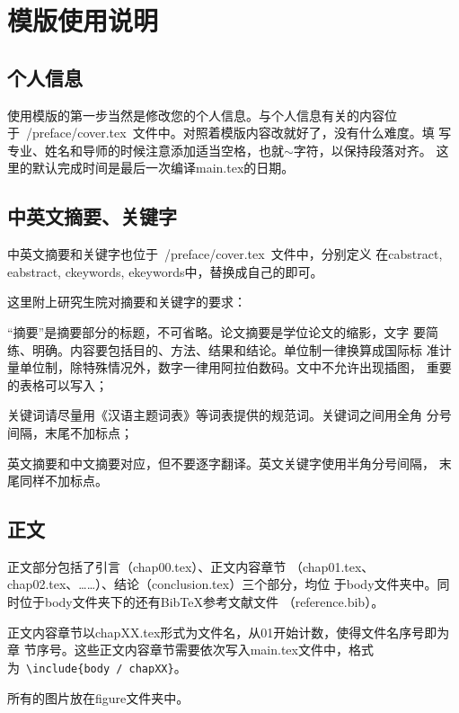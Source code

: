 ﻿%

\chapter{模版使用说明}
\label{chap01}

\section{个人信息}
使用模版的第一步当然是修改您的个人信息。与个人信息有关的内容位
于~{/preface/cover.tex}~文件中。对照着模版内容改就好了，没有什么难度。填
写专业、姓名和导师的时候注意添加适当空格，也就$\sim$字符，以保持段落对齐。
这里的默认完成时间是最后一次编译main.tex的日期。

\section{中英文摘要、关键字}
中英文摘要和关键字也位于~{/preface/cover.tex}~文件中，分别定义
在cabstract, eabstract, ckeywords, ekeywords中，替换成自己的即可。

这里附上研究生院对摘要和关键字的要求：
\begin{asparaenum}
\item “摘要”是摘要部分的标题，不可省略。论文摘要是学位论文的缩影，文字
  要简练、明确。内容要包括目的、方法、结果和结论。单位制一律换算成国际标
  准计量单位制，除特殊情况外，数字一律用阿拉伯数码。文中不允许出现插图，
  重要的表格可以写入；
\item 关键词请尽量用《汉语主题词表》等词表提供的规范词。关键词之间用全角
  分号间隔，末尾不加标点；
\item 英文摘要和中文摘要对应，但不要逐字翻译。英文关键字使用半角分号间隔，
  末尾同样不加标点。
\end{asparaenum}

\section{正文}
正文部分包括了引言（chap00.tex）、正文内容章节
（chap01.tex、chap02.tex、……）、结论（conclusion.tex）三个部分，均位
于body文件夹中。同时位于body文件夹下的还有Bib\TeX{}参考文献文件
（reference.bib）。

正文内容章节以chapXX.tex形式为文件名，从01开始计数，使得文件名序号即为章
节序号。这些正文内容章节需要依次写入main.tex文件中，格式
为~\texttt{\footnotesize \textbackslash include\{body / chapXX\}}。

所有的图片放在figure文件夹中。

